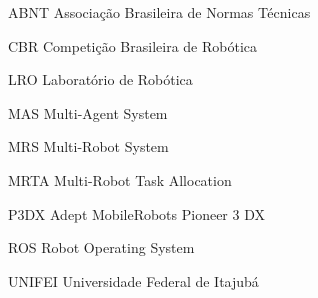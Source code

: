 \renewcommand{\nomname}{\listadesiglasname}
\pdfbookmark[0]{\nomname}{las}
\cleardoublepage
\begin{siglas}
    \item[ABNT] Associação Brasileira de Normas Técnicas
    \item[CBR] Competição Brasileira de Robótica
    \item[LRO] Laboratório de Robótica
    \item[MAS] Multi-Agent System
    \item[MRS] Multi-Robot System
    \item[MRTA] Multi-Robot Task Allocation
    \item[P3DX] Adept MobileRobots Pioneer 3 DX
    \item[ROS] Robot Operating System
    \item[UNIFEI] Universidade Federal de Itajubá
\end{siglas}